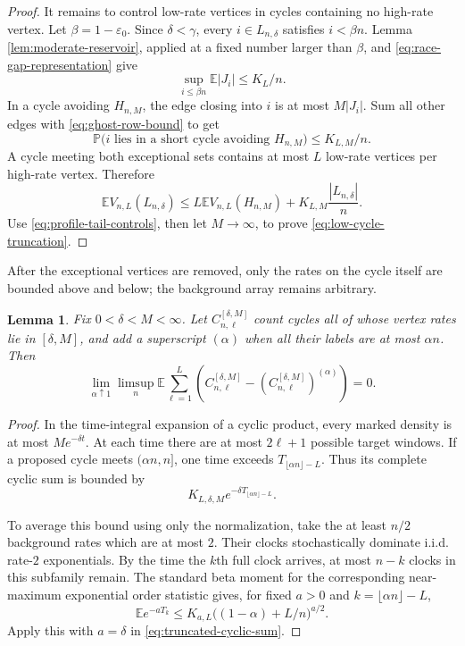 \documentclass[11pt]{article}
\newtheorem{lemma}[theorem]{Lemma}
\theoremstyle{remark}
\theoremstyle{plain}
\newcommand{\E}{\mathbb E}
\newcommand{\Pp}{\mathbb P}
\newcommand{\eps}{\varepsilon}
\begin{document}
\begin{proof}
It remains to control low-rate vertices in cycles containing no high-rate
vertex.  Let $\beta=1-\eps_0$.  Since $\delta<\gamma$, every
$i\in L_{n,\delta}$ satisfies $i<\beta n$.  Lemma
\ref{lem:moderate-reservoir}, applied at a fixed number larger than $\beta$,
and \eqref{eq:race-gap-representation} give
\begin{equation}\label{eq:interior-window-length}
 \sup_{i\le\beta n}\E|J_i|\le K_L/n.
\end{equation}
In a cycle avoiding $H_{n,M}$, the edge closing into $i$ is at most
$M|J_i|$.  Sum all other edges with \eqref{eq:ghost-row-bound} to get
\[
 \Pp\bigl(i\text{ lies in a short cycle avoiding }H_{n,M}\bigr)
 \le K_{L,M}/n.
\]
A cycle meeting both exceptional sets contains at most $L$ low-rate vertices
per high-rate vertex.  Therefore
\[
 \E V_{n,L}(L_{n,\delta})
 \le L\E V_{n,L}(H_{n,M})
   +K_{L,M}\frac{|L_{n,\delta}|}{n}.
\]
Use \eqref{eq:profile-tail-controls}, then let $M\to\infty$, to prove
\eqref{eq:low-cycle-truncation}.
\end{proof}

After the exceptional vertices are removed, only the rates on the cycle
itself are bounded above and below; the background array remains arbitrary.

\begin{lemma}\label{lem:truncated-cycle-tail}
Fix $0<\delta<M<\infty$.  Let $C_{n,\ell}^{[\delta,M]}$ count cycles all of
whose vertex rates lie in $[\delta,M]$, and add a superscript $(\alpha)$ when
all their labels are at most $\alpha n$.  Then
\begin{equation}\label{eq:truncated-cycle-tail}
 \lim_{\alpha\uparrow1}\limsup_n
 \E\sum_{\ell=1}^L
 \left(C_{n,\ell}^{[\delta,M]}
 -(C_{n,\ell}^{[\delta,M]})^{(\alpha)}\right)=0.
\end{equation}
\end{lemma}

\begin{proof}
In the time-integral expansion of a cyclic product, every marked density is
at most $Me^{-\delta t}$.  At each time there are at most $2\ell+1$ possible
target windows.  If a proposed cycle meets $(\alpha n,n]$, one time exceeds
$T_{\lfloor\alpha n\rfloor-L}$.  Thus its complete cyclic sum is bounded by
\begin{equation}\label{eq:truncated-cyclic-sum}
 K_{L,\delta,M}e^{-\delta T_{\lfloor\alpha n\rfloor-L}}.
\end{equation}

To average this bound using only the normalization, take the at least $n/2$
background rates which are at most $2$.  Their clocks stochastically dominate
i.i.d. rate-$2$ exponentials.  By the time the $k$th full clock arrives, at
most $n-k$ clocks in this subfamily remain.  The standard beta moment for the
corresponding near-maximum exponential order statistic gives, for fixed
$a>0$ and $k=\lfloor\alpha n\rfloor-L$,
\begin{equation}\label{eq:late-order-moment}
 \E e^{-aT_k}
 \le K_{a,L}\bigl((1-\alpha)+L/n\bigr)^{a/2}.
\end{equation}
Apply this with $a=\delta$ in \eqref{eq:truncated-cyclic-sum}.
\end{proof}
\end{document}
